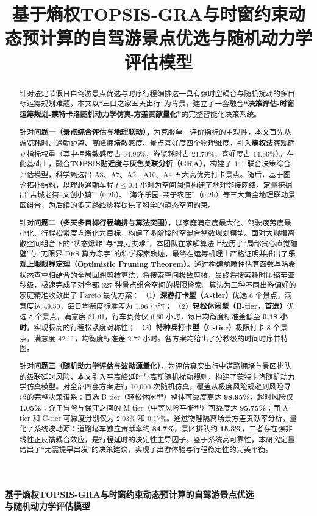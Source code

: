 \documentclass{cumcmthesis}
\title{\textbf{基于熵权TOPSIS-GRA与时窗约束动态预计算的自驾游景点优选与随机动力学评估模型}}
\author{}
\date{}
\begin{document}
\thispagestyle{empty}
\begingroup
\renewcommand{\baselinestretch}{1.2}
\setlength{\cftbeforesecskip}{5pt}
\setcounter{tocdepth}{2}
\tableofcontents
\endgroup
\newpage
{}
\setcounter{page}{1}
\begin{center}
\Large\textbf{基于熵权TOPSIS-GRA与时窗约束动态预计算的自驾游景点优选\\
与随机动力学评估模型}
\end{center}
\vspace{0.5cm}
\begin{abstract}
针对法定节假日自驾游景点优选与时序行程编排这一具有强时空耦合与随机扰动的多目标运筹规划难题，本文以“三口之家五天出行”为背景，建立了一套融合\textbf{“决策评估-时窗运筹规划-蒙特卡洛随机动力学仿真-方差贡献量化”}的完整智能化决策系统。

针对\textbf{问题一（景点综合评估与地理联动）}，为克服单一评价指标的主观性，本文首先从游览耗时、通勤距离、高峰拥堵敏感度、景点喜好度四个物理维度，引入\textbf{熵权法}客观确立指标权重（其中拥堵敏感度占 $54.96\%$，游览耗时占 $21.70\%$，喜好度占 $14.56\%$）。在此基础上，融合\textbf{TOPSIS贴近度}与\textbf{灰色关联分析（GRA）}，构建了 $1:1$ 联合决策综合评估模型，科学甄选出 A3、A7、A2、A10、A4 五大高优先打卡景点。随后，基于图论拓扑结构，以理想通勤车程 $t \le 0.4$ 小时为空间阈值构建了地理邻接网络，定量挖掘出“古城老街--文创小镇”（0.2h）、“海洋乐园--亲子农庄”（0.2h）等三大黄金地理联动景区组合，为后续的多天路线排程提供了科学的静态空间约束。

针对\textbf{问题二（多天多目标行程编排与算法突围）}，以家庭满意度最大化、驾驶疲劳度最小化、行程松紧度均衡化为目标，构建了多阶段时空混合整数规划模型。面对大规模离散空间组合下的“状态爆炸”与“算力灾难”，本团队在求解算法上经历了“局部贪心直觉碰壁”与“无限界 DFS 算力赤字”的科学探索轨迹，最终在运筹机理上严格证明并推出了\textbf{乐观上限限界定理（Optimistic Pruning Theorem）}。通过构建前瞻性估算函数与哈希状态查重相结合的全局回溯剪枝算法，将搜索空间极致剪枝，最终将搜索耗时压缩至亚秒级，极速完成了对全部 627 种景点组合空间的极限检索。算法为三种不同出游偏好的家庭精准收敛出了 Pareto 最优方案：
（1）\textbf{深游打卡型（A-tier）}优选 6 个景点，满意度达 49.50，每日均衡度标准差为 1.96 小时；
（2）\textbf{轻松休闲型（B-tier，首选）}优选 5 个景点，满意度 31.61，行车负荷仅 6.60 小时，每日均衡度标准差低至 \textbf{0.18 小时}，实现极高的行程松紧度对称性；
（3）\textbf{特种兵打卡型（C-tier）}极限打卡 8 个景点，满意度 42.11，均衡度标准差 2.72 小时。各方案均给出了分秒级的时间时序甘特图。

针对\textbf{问题三（随机动力学评估与波动源量化）}，为评估真实出行中道路拥堵与景区排队的级联延时风险，本文引入平高峰延时与高斯随机扰动规则，构建了蒙特卡洛随机动力学仿真模型。对全部四套方案进行 10,000 次随机仿真，覆盖从极度风险规避到风险寻求的完整决策谱系：首选 B-tier（轻松休闲型）整体可靠度高达 \textbf{98.95\%}，超时风险仅 \textbf{1.05\%}；介于冒险与保守之间的 M-tier（中等风险平衡型）可靠度达 \textbf{95.75\%}；而 A-tier 和 C-tier 可靠度分别仅为 2.03\% 和 0.17\%。通过物理隔离场景方差贡献率分析，量化了系统波动源：道路堵车独立贡献率约 \textbf{84.7\%}，景区排队约 \textbf{15.3\%}，二者存在强非线性正反馈耦合效应，是行程延时的决定性主导因子。鉴于系统高可靠性，本研究定量给出了“无需提早出发”的决策建议，实现了出游体验与行程稳定性的完美平衡。


\end{abstract}
\end{document}
